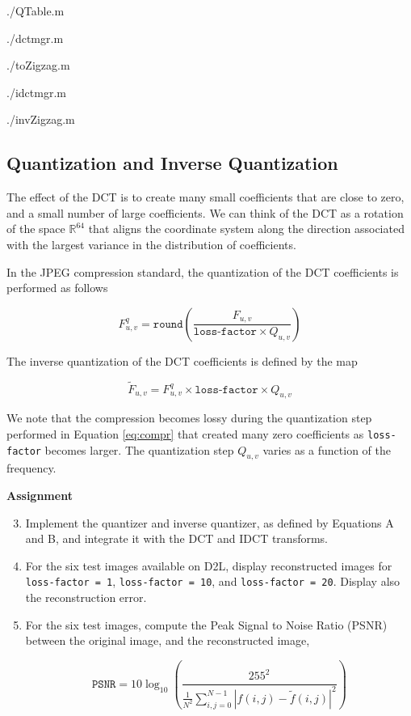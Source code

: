 \documentclass{article} %
\begin{document}

{./QTable.m}  

{./dctmgr.m} 

{./toZigzag.m} 

{./idctmgr.m} 

{./invZigzag.m} 


\subsection{Quantization and Inverse Quantization}
The effect of the DCT is to create many small coefficients that are close to zero, and a small number
of large coefficients. We can think of the DCT as a rotation of the space $\mathbb{R}^{64}$ that aligns
the coordinate system along the direction associated with the largest variance in the distribution of coefficients. 

In the JPEG compression standard, the quantization of the DCT coefficients is performed as follows

\begin{equation}
\label{eq:compr}
F_{u,v}^{q} = \texttt{round}\left( \frac{F_{u,v}}{\texttt{loss-factor} \times Q_{u,v}}\right)
\end{equation}

The inverse quantization of the DCT coefficients is defined by the map

\begin{equation}
\label{eq:decompr}
\widetilde{F}_{u,v}=F_{u,v}^{q} \times \texttt{loss-factor} \times Q_{u,v}
\end{equation}

We note that the compression becomes lossy during the quantization step performed in Equation
\ref{eq:compr} that created many zero coefficients as \verb|loss-factor| becomes larger. The
quantization step $Q_{u,v}$ varies as a function of the frequency. 


\begin{framed}
\textbf{Assignment}
\begin{enumerate}
\setcounter{enumi}{2}
\item Implement the quantizer and inverse quantizer, as defined by Equations A and B, and integrate it with the
DCT and IDCT transforms.

\item For the six test images available on D2L, display reconstructed images for \verb|loss-factor = 1|, 
\verb|loss-factor = 10|, and \verb|loss-factor = 20|. Display also the reconstruction error. 

\item For the six test images, compute the Peak Signal to Noise Ratio (PSNR) between the original
image, and the reconstructed image,

\begin{equation}
\texttt{PSNR}= 10 \log_{10} \left( \frac{255^2}{\frac{1}{N^2} \sum_{i,j=0}^{N-1} |f(i,j) - \widetilde{f}(i,j)|^2} \right)
\end{equation}

\end{enumerate}
\end{framed}
\end{document}
